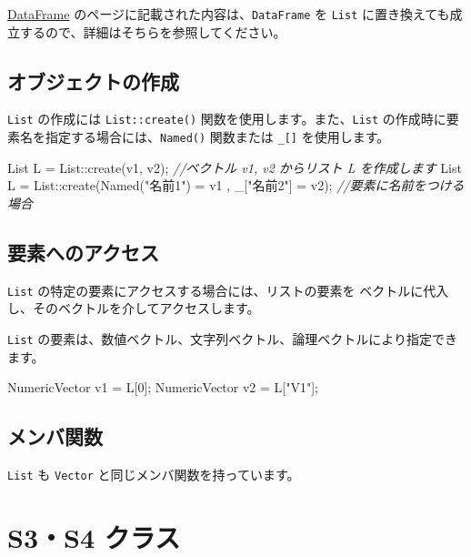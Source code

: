 \documentclass[]{book}
\newenvironment{Shaded}{\begin{snugshade}}{\end{snugshade}}
\newcommand{\CommentTok}[1]{\textcolor[rgb]{0.56,0.35,0.01}{\textit{#1}}}
\newcommand{\DecValTok}[1]{\textcolor[rgb]{0.00,0.00,0.81}{#1}}
\newcommand{\NormalTok}[1]{#1}
\newcommand{\StringTok}[1]{\textcolor[rgb]{0.31,0.60,0.02}{#1}}
\begin{document}
\href{dataframe.md}{DataFrame} のページに記載された内容は、\texttt{DataFrame} を \texttt{List} に置き換えても成立するので、詳細はそちらを参照してください。

\section{オブジェクトの作成}

\texttt{List} の作成には \texttt{List::create()} 関数を使用します。また、\texttt{List} の作成時に要素名を指定する場合には、\texttt{Named()} 関数または \texttt{\_{[}{]}} を使用します。

\begin{Shaded}
\begin{Highlighting}[]
\NormalTok{List L = List::create(v1, v2); }\CommentTok{//ベクトル v1, v2 からリスト L を作成します}
\NormalTok{List L = List::create(Named(}\StringTok{"名前1"}\NormalTok{) = v1 , _[}\StringTok{"名前2"}\NormalTok{] = v2); }\CommentTok{//要素に名前をつける場合}
\end{Highlighting}
\end{Shaded}

\section{要素へのアクセス}

\texttt{List} の特定の要素にアクセスする場合には、リストの要素を ベクトルに代入し、そのベクトルを介してアクセスします。

\texttt{List} の要素は、数値ベクトル、文字列ベクトル、論理ベクトルにより指定できます。

\begin{Shaded}
\begin{Highlighting}[]
\NormalTok{NumericVector v1 = L[}\DecValTok{0}\NormalTok{];}
\NormalTok{NumericVector v2 = L[}\StringTok{"V1"}\NormalTok{];}
\end{Highlighting}
\end{Shaded}

\hypertarget{-1}{%
\section{メンバ関数}\label{-1}}

\texttt{List} も \texttt{Vector} と同じメンバ関数を持っています。

\hypertarget{s3s4-}{%
\chapter{S3・S4 クラス}\label{s3s4-}}
\end{document}
